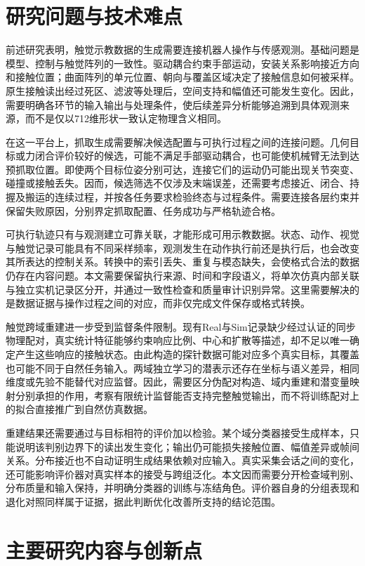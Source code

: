 
\section{研究问题与技术难点}
\label{sec:research_problems}

前述研究表明，触觉示教数据的生成需要连接机器人操作与传感观测。基础问题是模型、控制与触觉阵列的一致性。驱动耦合约束手部运动，安装关系影响接近方向和接触位置；曲面阵列的单元位置、朝向与覆盖区域决定了接触信息如何被采样。原生接触读出经过死区、滤波等处理后，空间支持和幅值还可能发生变化。因此，需要明确各环节的输入输出与处理条件，使后续差异分析能够追溯到具体观测来源，而不是仅以712维形状一致认定物理含义相同。

在这一平台上，抓取生成需要解决候选配置与可执行过程之间的连接问题。几何目标或力闭合评价较好的候选，可能不满足手部驱动耦合，也可能使机械臂无法到达预抓取位置。即使两个目标位姿分别可达，连接它们的运动仍可能出现关节突变、碰撞或接触丢失。因而，候选筛选不仅涉及末端误差，还需要考虑接近、闭合、持握及搬运的连续过程，并按各任务要求检验终态与过程条件。需要连接各层约束并保留失败原因，分别界定抓取配置、任务成功与严格轨迹合格。

可执行轨迹只有与观测建立可靠关联，才能形成可用示教数据。状态、动作、视觉与触觉记录可能具有不同采样频率，观测发生在动作执行前还是执行后，也会改变其所表达的控制关系。转换中的索引丢失、重复与模态缺失，会使格式合法的数据仍存在内容问题。本文需要保留执行来源、时间和字段语义，将单次仿真内部关联与独立实机记录区分开，并通过一致性检查和质量审计识别异常。这里需要解决的是数据证据与操作过程之间的对应，而非仅完成文件保存或格式转换。

触觉跨域重建进一步受到监督条件限制。现有Real与Sim记录缺少经过认证的同步物理配对，真实统计特征能够约束响应比例、中心和扩散等描述，却不足以唯一确定产生这些响应的接触状态。由此构造的探针数据可能对应多个真实目标，其覆盖也可能不同于自然任务输入。两域独立学习的潜表示还存在坐标与语义差异，相同维度或先验不能替代对应监督。因此，需要区分伪配对构造、域内重建和潜变量映射分别承担的作用，考察有限统计监督能否支持完整触觉输出，而不将训练配对上的拟合直接推广到自然仿真数据。

重建结果还需要通过与目标相符的评价加以检验。某个域分类器接受生成样本，只能说明该判别边界下的读出发生变化；输出仍可能损失接触位置、幅值差异或帧间关系。分布接近也不自动证明生成结果依赖对应输入。真实采集会话之间的变化，还可能影响评价器对真实样本的接受与跨组泛化。本文因而需要分开检查域判别、分布质量和输入保持，并明确分类器的训练与冻结角色。评价器自身的分组表现和退化对照同样属于证据，据此判断优化改善所支持的结论范围。

\section{主要研究内容与创新点}
\label{sec:research_contents}

